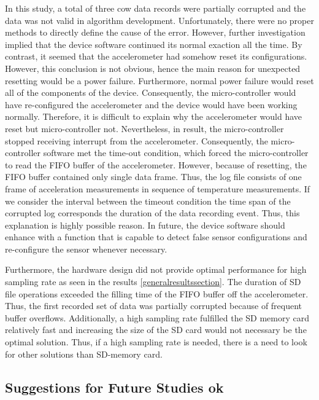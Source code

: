 \documentclass[english,12pt,a4paper,pdftex,elec,utf8]{aaltothesis}
\begin{document}
In this study, a total of three cow data records were partially corrupted and the data was not valid in algorithm development. Unfortunately, there were no proper methods to directly define the cause of the error. However, further investigation implied that the device software continued its normal exaction all the time. By contrast, it seemed that the accelerometer had somehow reset its configurations. However, this conclusion is not obvious, hence the main reason for unexpected resetting would be a power failure. Furthermore, normal power failure would reset all of the components of the device. Consequently, the micro-controller would have re-configured the accelerometer and the device would have been working normally. Therefore, it is difficult to explain why the accelerometer would have reset but micro-controller not. Nevertheless, in result, the micro-controller stopped receiving interrupt from the accelerometer. Consequently, the micro-controller software met the time-out condition, which forced the micro-controller to read the FIFO buffer of the accelerometer. However, because of resetting, the FIFO buffer contained only single data frame. Thus, the log file consists of one frame of acceleration measurements in sequence of temperature measurements. If we consider the interval between the timeout condition the time span of the corrupted log corresponds the duration of the data recording event. Thus, this explanation is highly possible reason. In future, the device software should enhance with a function that is capable to detect false sensor configurations and re-configure the sensor whenever necessary.


Furthermore, the hardware design did not provide optimal performance for high sampling rate as seen in the results \ref{generalresultssection}. The duration of SD file operations exceeded the filling time of the FIFO buffer off the accelerometer. Thus, the first recorded set of data was partially corrupted because of frequent buffer overflows. Additionally, a high sampling rate fulfilled the SD memory card relatively fast and increasing the size of the SD card would not necessary be the optimal solution. Thus, if a high sampling rate is needed, there is a need to look for other solutions than SD-memory card.


\subsection{Suggestions for Future Studies ok}
\end{document}
